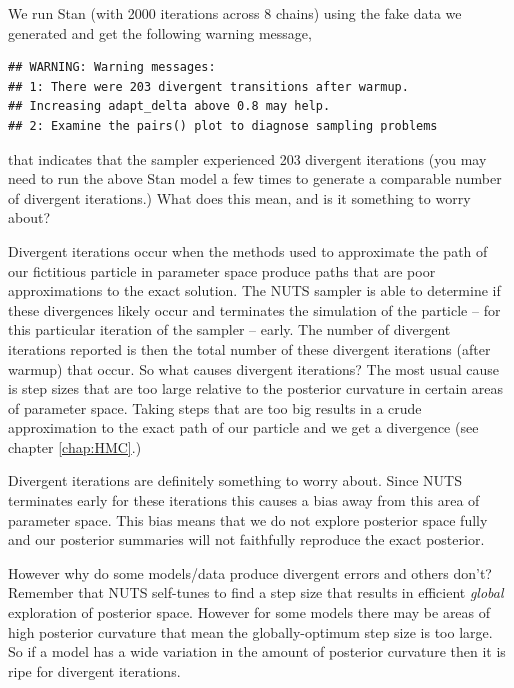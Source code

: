 \documentclass[11pt,fullpage]{book}
\makeatletter
\newenvironment{kframe}{%
	\def\at@end@of@kframe{}%
	\ifinner\ifhmode%
	\def\at@end@of@kframe{\end{minipage}}%
\begin{minipage}{\columnwidth}%
	\fi\fi%
	\def\FrameCommand##1{\hskip\@totalleftmargin \hskip-\fboxsep
		\colorbox{shadecolor}{##1}\hskip-\fboxsep
		\hskip-\linewidth \hskip-\@totalleftmargin \hskip\columnwidth}%
	\MakeFramed {\advance\hsize-\width
		\@totalleftmargin\z@ \linewidth\hsize
		\@setminipage}}%
{\par\unskip\endMakeFramed%
	\at@end@of@kframe}
\newenvironment{knitrout}{}{} %
\makeatother
\begin{document}
We run Stan (with 2000 iterations across 8 chains) using the fake data we generated and get the following warning message,

\begin{knitrout}\footnotesize
		\color{fgcolor}\begin{kframe}
\begin{verbatim}
## WARNING: Warning messages:
## 1: There were 203 divergent transitions after warmup. 
## Increasing adapt_delta above 0.8 may help. 
## 2: Examine the pairs() plot to diagnose sampling problems
\end{verbatim}
		\end{kframe}
	\end{knitrout}

that indicates that the sampler experienced 203 divergent iterations (you may need to run the above Stan model a few times to generate a comparable number of divergent iterations.) What does this mean, and is it something to worry about? 

Divergent iterations occur when the methods used to approximate the path of our fictitious particle in parameter space produce paths that are poor approximations to the exact solution. The NUTS sampler is able to determine if these divergences likely occur and terminates the simulation of the particle -- for this particular iteration of the sampler -- early. The number of divergent iterations reported is then the total number of these divergent iterations (after warmup) that occur. So what causes divergent iterations? The most usual cause is step sizes that are too large relative to the posterior curvature in certain areas of parameter space. Taking steps that are too big results in a crude approximation to the exact path of our particle and we get a divergence (see chapter \ref{chap:HMC}.)  

Divergent iterations are definitely something to worry about. Since NUTS terminates early for these iterations this causes a bias away from this area of parameter space. This bias means that we do not explore posterior space fully and our posterior summaries will not faithfully reproduce the exact posterior. 

However why do some models/data produce divergent errors and others don't? Remember that NUTS self-tunes to find a step size that results in efficient \textit{global} exploration of posterior space. However for some models there may be areas of high posterior curvature that mean the globally-optimum step size is too large. So if a model has a wide variation in the amount of posterior curvature then it is ripe for divergent iterations. 
\end{document}
